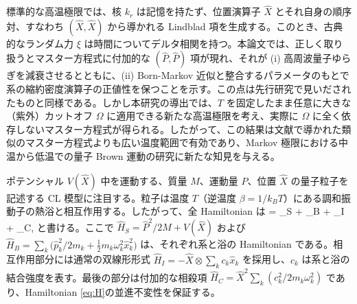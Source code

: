 標準的な高温極限\cite{CaldeiraLeggettA}では、核 $k_r$ は記憶を持たず、位置演算子 $\hat X$ とそれ自身の順序対、すなわち $(\hat X,\hat X)$ から導かれる Lindblad 項を生成する。このとき、古典的なランダム力 $\xi$ は時間についてデルタ相関を持つ。本論文では、正しく取り扱うとマスター方程式に付加的な $(\hat P,\hat P)$ 項が現れ、それが (i) 高周波量子ゆらぎを減衰させるとともに、(ii) Born-Markov 近似と整合するパラメータのもとで系の縮約密度演算子の正値性を保つことを示す。この点は先行研究\cite{BP2002,Diosi1993,Diosi1993a,Halliwell1995,Gao1997,Ford1999,Vacchini2000,Petruccione2005}で見いだされたものと同様である。しかし本研究の導出では、$T$ を固定したまま任意に大きな（紫外）カットオフ $\Omega$ に適用できる新たな高温極限を考え、実際に $\Omega$ に全く依存しないマスター方程式が得られる。したがって、この結果は文献\cite{BP2002,Diosi1993,Diosi1993a}で導かれた類似のマスター方程式よりも広い温度範囲で有効であり、Markov 極限における中温から低温での量子 Brown 運動の研究に新たな知見を与える。

ポテンシャル $V(\hat X)$ 中を運動する、質量 $M$、運動量 $\hat P$、位置 $\hat X$ の量子粒子を記述する CL 模型\cite{CaldeiraLeggettA}に注目する。粒子は温度 $T$（逆温度 $\beta=1/k_BT$）にある調和振動子の熱浴と相互作用する。したがって、全 Hamiltonian は
\be\label{eq:H}
 = _S + _B + _I + _C,
\ee
と書ける。ここで $\hat{H}_S=\hat{P}^2/2M+V(\hat{X})$ および $\hat{H}_B=\sum_k\big(\hat{p}_k^2/2m_k+\frac12m_k\omega_k^2\hat{x}_k^2\big)$ は、それぞれ系と浴の Hamiltonian である。相互作用部分には通常の双線形形式 $\hat H_I=-\hat X\otimes\sum_kc_k\hat x_k$ を採用し、$c_k$ は系と浴の結合強度を表す。最後の部分は付加的な相殺項 $\hat H_C=\hat X^2\sum_k(c_k^2/2m_k\omega_k^2)$ であり、Hamiltonian \eqref{eq:H}の並進不変性を保証する。

